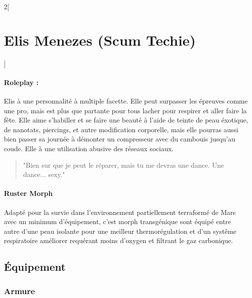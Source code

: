 \documentclass[a4paper,9pt]{article}
\begin{document}
\begin{multicols}{2}[\section*{Elis Menezes (Scum Techie)}]
   \paragraph{Roleplay :}
   Elis à une personnalité à multiple facette.
   Elle peut surpasser les épreuves comme une pro, mais est plus que partante
   pour tous lacher pour respirer et aller faire la fête.
   Elle aime s'habiller et se faire une beauté à l'aide de teinte de peau
   éxotique, de nanotats, piercings, et autre modification corporelle, mais
   elle pourras aussi bien passer sa journée à démonter un compresseur avec
   du cambouis jusqu'au coude.
   Elle à une utilisation abusive des réseaux sociaux.

   \begin{quote}
      "Bien sur que je peut le réparer, mais tu me devras une dance. Une
      dance... sexy."
   \end{quote}

   \paragraph{Ruster Morph}
   Adapté pour la survie dans l'environnement partiellement terraformé de Mars
   avec un minimum d'équipement, c'est morph transgénique sont équipé entre autre
   d'une peau isolante pour une meilleur thermorégulation et d'un systême
   respiratoire améliorer requérant moins d'oxygen et filtrant le gaz
   carbonique. 

   \subsection*{Équipement}

   \subsubsection*{Armure}


\end{multicols}
\end{document}
